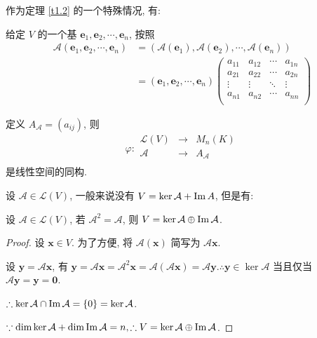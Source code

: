 \documentclass[color=black,device=normal,lang=cn,mode=geye]{elegantnote}
\begin{document}
作为定理 \ref{t1.2} 的一个特殊情况, 有:
\begin{theorem}\label{t2.1}
    给定 $V$ 的一个基 $\boldsymbol{e}_1,\boldsymbol{e}_2,\cdots,\boldsymbol{e}_n$, 按照
    \begin{align*}
        \mathcal{A}(\boldsymbol{e}_1,\boldsymbol{e}_2,\cdots,\boldsymbol{e}_n) & =(\mathcal{A}(\boldsymbol{e}_1),\mathcal{A}(\boldsymbol{e}_2),\cdots,\mathcal{A}(\boldsymbol{e}_n)) \\
        & =(\boldsymbol{e}_1,\boldsymbol{e}_2,\cdots,\boldsymbol{e}_n)\begin{pmatrix}
            a_{11} & a_{12} & \cdots & a_{1n} \\
            a_{21} & a_{22} & \cdots & a_{2n} \\
            \vdots & \vdots & \ddots & \vdots \\
            a_{n1} & a_{n2} & \cdots & a_{nn} \\
        \end{pmatrix}
    \end{align*}

    定义 $A_\mathcal{A}=(a_{ij})$, 则
    \[\varphi:\begin{array}{rcl}
        \mathcal{L}(V) & \to & M_n(K) \\
        \mathcal{A} & \to & A_\mathcal{A} \\
    \end{array}\]
    是线性空间的同构.
\end{theorem}
设 $\mathcal{A}\in\mathcal{L}(V)$, 一般来说没有 $V=\ker\mathcal{A}+\operatorname{Im} A$, 但是有:
\begin{example}\label{exa2.2}
    设 $\mathcal{A}\in\mathcal{L}(V)$, 若 $\mathcal{A}^2=\mathcal{A}$, 则 $V=\ker\mathcal{A}\oplus\operatorname{Im} \mathcal{A}$.
\end{example}
\begin{proof}
    设 $\boldsymbol{x}\in V$. 为了方便, 将 $\mathcal{A}(\boldsymbol{x})$ 简写为 $\mathcal{A}\boldsymbol{x}$.

    设 $\boldsymbol{y}=\mathcal{A}\boldsymbol{x}$, 有 $\boldsymbol{y}=\mathcal{A}\boldsymbol{x}=\mathcal{A}^2\boldsymbol{x}=\mathcal{A}(\mathcal{A}\boldsymbol{x})=\mathcal{A}\boldsymbol{y}.\therefore\boldsymbol{y}\in\ker\mathcal{A}$ 当且仅当 $\mathcal{A}\boldsymbol{y}=\boldsymbol{y}=\boldsymbol{0}$.

    $\therefore\ker\mathcal{A}\cap\operatorname{Im} \mathcal{A}=\{0\}=\ker\mathcal{A}$.

    $\because\dim\ker\mathcal{A}+\dim\operatorname{Im} \mathcal{A}=n,\therefore V=\ker\mathcal{A}\oplus\operatorname{Im} \mathcal{A}$.
\end{proof}
\end{document}
